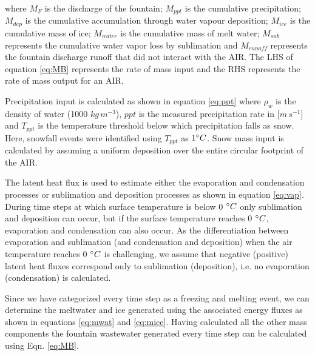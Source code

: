 \documentclass[utf8]{frontiersSCNS} %
\begin{document}
where $M_{F}$ is the discharge of the fountain; $M_{ppt}$ is the cumulative precipitation;  $M_{dep}$ is the cumulative
accumulation through water vapour deposition; $M_{ice}$ is the cumulative mass of ice; $M_{water}$ is the cumulative
mass of melt water; $M_{sub}$ represents the cumulative water vapor loss by sublimation and $M_{runoff}$ represents the
fountain discharge runoff that did not interact with the AIR. The LHS of equation \ref{eq:MB} represents the rate of
mass input and the RHS represents the rate of mass output for an AIR.

Precipitation input is calculated as shown in equation \ref{eq:ppt} where $\rho_{w}$ is the density of water (1000
$kg\,m^{-3}$), $ppt$ is the measured precipitation rate in [$m\,s^{-1}$] and $T_{ppt}$ is the temperature threshold
below which precipitation falls as snow. Here, snowfall events were identified using $T_{ppt}$ as $1 \degree C$. Snow
mass input is calculated by assuming a uniform deposition over the entire circular footprint of the AIR.

The latent heat flux is used to estimate either the evaporation and condensation processes or sublimation and deposition
processes as shown in equation \ref{eq:vap}. During time steps at which surface temperature is below 0 $\degree C$ only
sublimation and deposition can occur, but if the surface temperature reaches 0 $\degree C$, evaporation and condensation
can also occur. As the differentiation between evaporation and sublimation (and condensation and deposition) when the
air temperature reaches 0 $\degree C$ is challenging, we assume that negative (positive) latent heat fluxes correspond
only to sublimation (deposition), i.e. no evaporation (condensation) is calculated.

Since we have categorized every time step as a freezing and melting event, we can determine the meltwater and  ice
generated using the associated energy fluxes as shown in equations \ref{eq:mwat} and \ref{eq:mice}. Having
calculated all the other mass components the fountain wastewater generated every time step can be calculated using
Eqn. \ref{eq:MB}.
\end{document}
